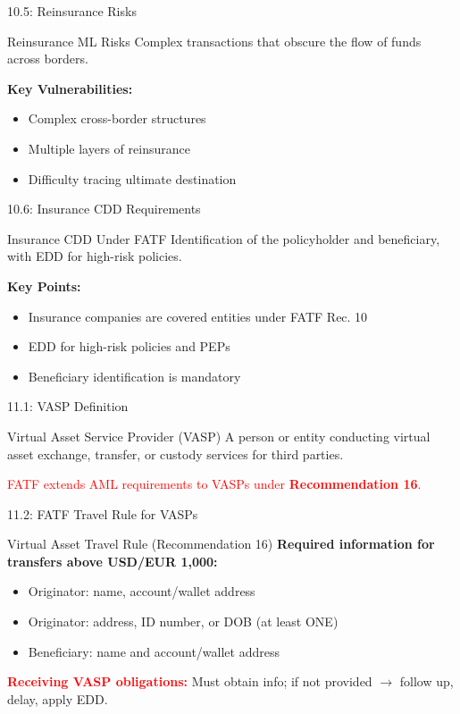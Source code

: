 \documentclass{beamer}
\begin{document}
	\begin{frame}{10.5: Reinsurance Risks}
		\begin{block}{Reinsurance ML Risks}
			Complex transactions that obscure the flow of funds across borders.
		\end{block}
		\textbf{Key Vulnerabilities:}
		\begin{itemize}
			\item Complex cross-border structures
			\item Multiple layers of reinsurance
			\item Difficulty tracing ultimate destination
		\end{itemize}
	\end{frame}
	
	\begin{frame}{10.6: Insurance CDD Requirements}
		\begin{block}{Insurance CDD Under FATF}
			Identification of the policyholder and beneficiary, with EDD for high-risk policies.
		\end{block}
		\textbf{Key Points:}
		\begin{itemize}
			\item Insurance companies are covered entities under FATF Rec. 10
			\item EDD for high-risk policies and PEPs
			\item Beneficiary identification is mandatory
		\end{itemize}
	\end{frame}
	
	
	\begin{frame}{11.1: VASP Definition}
		\begin{block}{Virtual Asset Service Provider (VASP)}
			A person or entity conducting virtual asset exchange, transfer, or custody services for third parties.
		\end{block}
		\textcolor{red}{FATF extends AML requirements to VASPs under \textbf{Recommendation 16}.}
	\end{frame}
	
	\begin{frame}{11.2: FATF Travel Rule for VASPs}
		\begin{block}{Virtual Asset Travel Rule (Recommendation 16)}
			\textbf{Required information for transfers above USD/EUR 1,000:}
			\begin{itemize}
				\item Originator: name, account/wallet address
				\item Originator: address, ID number, or DOB (at least ONE)
				\item Beneficiary: name and account/wallet address
			\end{itemize}
		\end{block}
		\textcolor{red}{\textbf{Receiving VASP obligations:}} Must obtain info; if not provided $\rightarrow$ follow up, delay, apply EDD.
	\end{frame}
	
\end{document}
